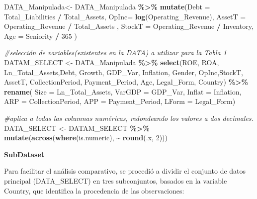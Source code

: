 \documentclass[
]{article}
\newenvironment{Shaded}{\begin{snugshade}}{\end{snugshade}}
\newcommand{\AttributeTok}[1]{\textcolor[rgb]{0.13,0.29,0.53}{#1}}
\newcommand{\CommentTok}[1]{\textcolor[rgb]{0.56,0.35,0.01}{\textit{#1}}}
\newcommand{\DecValTok}[1]{\textcolor[rgb]{0.00,0.00,0.81}{#1}}
\newcommand{\FunctionTok}[1]{\textcolor[rgb]{0.13,0.29,0.53}{\textbf{#1}}}
\newcommand{\NormalTok}[1]{#1}
\newcommand{\OtherTok}[1]{\textcolor[rgb]{0.56,0.35,0.01}{#1}}
\newcommand{\SpecialCharTok}[1]{\textcolor[rgb]{0.81,0.36,0.00}{\textbf{#1}}}
\begin{document}
\begin{Shaded}
\begin{Highlighting}[]
\NormalTok{DATA\_Manipulada}\OtherTok{\textless{}{-}}\NormalTok{ DATA\_Manipulada }\SpecialCharTok{\%\textgreater{}\%}
  \FunctionTok{mutate}\NormalTok{(}\AttributeTok{Debt =}\NormalTok{ Total\_Liabilities }\SpecialCharTok{/}\NormalTok{ Total\_Assets,}
         \AttributeTok{OpInc=} \FunctionTok{log}\NormalTok{(Operating\_Revenue),}
         \AttributeTok{AssetT =}\NormalTok{ Operating\_Revenue }\SpecialCharTok{/}\NormalTok{ Total\_Assets ,}
         \AttributeTok{StockT =}\NormalTok{ Operating\_Revenue }\SpecialCharTok{/}\NormalTok{ Inventory,}
         \AttributeTok{Age =}\NormalTok{ Seniority }\SpecialCharTok{/} \DecValTok{365}\NormalTok{ )}


\CommentTok{\#selección de variables(existentes en la DATA) a utilizar para la Tabla 1}
\NormalTok{DATAM\_SELECT }\OtherTok{\textless{}{-}}\NormalTok{ DATA\_Manipulada }\SpecialCharTok{\%\textgreater{}\%}
  \FunctionTok{select}\NormalTok{(ROE, ROA, Ln\_Total\_Assets,Debt, Growth, GDP\_Var, Inflation, Gender, }
\NormalTok{         OpInc,StockT, AssetT, CollectionPeriod, }
\NormalTok{         Payment\_Period, Age, Legal\_Form, Country) }\SpecialCharTok{\%\textgreater{}\%}
  \FunctionTok{rename}\NormalTok{(}
    \AttributeTok{Size =}\NormalTok{ Ln\_Total\_Assets,}
    \AttributeTok{VarGDP =}\NormalTok{ GDP\_Var,}
    \AttributeTok{Inflat =}\NormalTok{ Inflation,}
    \AttributeTok{ARP =}\NormalTok{ CollectionPeriod,}
    \AttributeTok{APP =}\NormalTok{ Payment\_Period,}
    \AttributeTok{LForm =}\NormalTok{ Legal\_Form) }


\CommentTok{\#aplica a todas las columnas numéricas, redondeando los valores a dos decimales.}
\NormalTok{DATA\_SELECT }\OtherTok{\textless{}{-}}\NormalTok{ DATAM\_SELECT }\SpecialCharTok{\%\textgreater{}\%}
  \FunctionTok{mutate}\NormalTok{(}\FunctionTok{across}\NormalTok{(}\FunctionTok{where}\NormalTok{(is.numeric), }\SpecialCharTok{\textasciitilde{}} \FunctionTok{round}\NormalTok{(.x, }\DecValTok{2}\NormalTok{))) }
\end{Highlighting}
\end{Shaded}

\textbf{SubDataset}

Para facilitar el análisis comparativo, se procedió a dividir el
conjunto de datos principal (DATA\_SELECT) en tres subconjuntos, basados
en la variable Country, que identifica la procedencia de las
observaciones:
\end{document}
